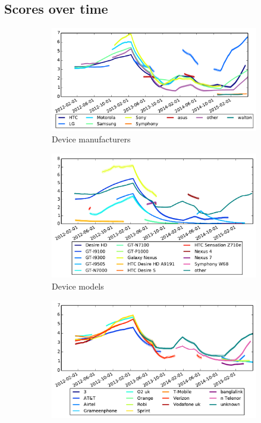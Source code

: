 \subsection{Scores over time}
\begin{figure}
\centering
\begin{subfigure}{\columnwidth}
\includegraphics[width=\columnwidth]{figures/security_score_manufacturer}
\caption{Device manufacturers}
\label{fig:security_score_manufacturer}
\end{subfigure}
%
\begin{subfigure}{\columnwidth}
\includegraphics[width=\columnwidth]{figures/security_score_model}
\caption{Device models}
\label{fig:security_score_model}
\end{subfigure}
%
\begin{subfigure}{\columnwidth}
\includegraphics[width=\columnwidth]{figures/security_score_operator}

\end{subfigure}
\end{figure}

